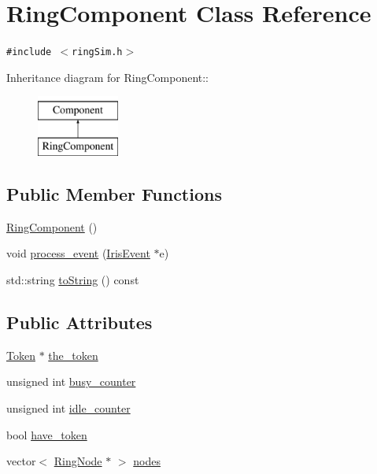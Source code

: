 \hypertarget{classRingComponent}{
\section{RingComponent Class Reference}
\label{classRingComponent}
}
{\tt \#include $<$ringSim.h$>$}

Inheritance diagram for RingComponent::\begin{figure}[H]
\begin{center}
\leavevmode
\includegraphics[height=2cm]{classRingComponent}
\end{center}
\end{figure}
\subsection*{Public Member Functions}
\begin{CompactItemize}
\item 
\hyperlink{classRingComponent_b1ac3deb3f376e139df8ef4297546ff7}{RingComponent} ()
\item 
void \hyperlink{classRingComponent_8d5e430edd1b65b4668d7809a4c9b786}{process\_\-event} (\hyperlink{classIrisEvent}{IrisEvent} $\ast$e)
\item 
std::string \hyperlink{classRingComponent_e042ce6bbff686ce85ef6b4d09336932}{toString} () const 
\end{CompactItemize}
\subsection*{Public Attributes}
\begin{CompactItemize}
\item 
\hyperlink{classToken}{Token} $\ast$ \hyperlink{classRingComponent_707b2902f6ade01455d59dfee169481e}{the\_\-token}
\item 
unsigned int \hyperlink{classRingComponent_71558da628a1c33a5f9c3e3da5d57b91}{busy\_\-counter}
\item 
unsigned int \hyperlink{classRingComponent_626741c90d660ecb9724d157d082358b}{idle\_\-counter}
\item 
bool \hyperlink{classRingComponent_0bb078fae44444ad14cc8cdcccf2b10d}{have\_\-token}
\item 
vector$<$ \hyperlink{classRingNode}{RingNode} $\ast$ $>$ \hyperlink{classRingComponent_22fec1a57c9a1e34633e94052dbe0ec0}{nodes}
\end{CompactItemize}


